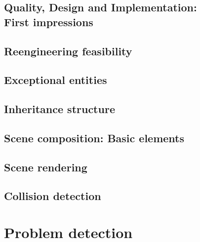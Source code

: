 \documentclass[a4paper, 10pt]{article}
\begin{document}
\subsection{Quality, Design and Implementation:\\First impressions}
\label{sec:first_impressions}


\subsection{Reengineering feasibility}
\label{sec:reengineering_feasibility}


\subsection{Exceptional entities}
\label{sec:exceptional_entities}


\subsection{Inheritance structure}
\label{sec:inheritance_structure}


\subsection{Scene composition: Basic elements}
\label{sec:scene_composition}


\subsection{Scene rendering}
\label{sec:scene_rendering}


\subsection{Collision detection}
\label{sec:collision_detection}


\newpage
\section{Problem detection}
\label{sec:problem_detection}
\end{document}
